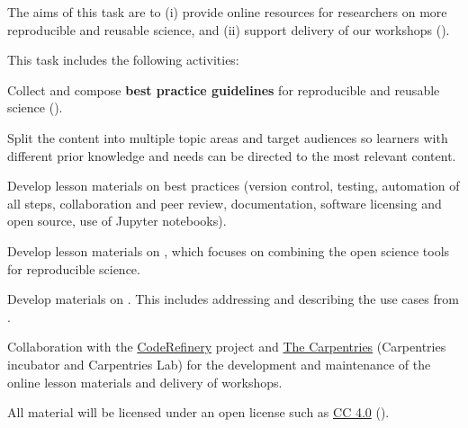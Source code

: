 \begin{task}[
  title=Best practice guidelines for reproducible science,
  id=online-resources,
  lead=IFR,
  PM=13,
  partners={SRL,MP,UIO}
]
The aims of this task are to (i) provide online resources for researchers on more reproducible
and reusable science, and (ii) support delivery of our workshops
().

This task includes the following activities:
  \begin{compactitem}
  \item Collect and compose \textbf{best practice guidelines} for reproducible and
    reusable science ().
  \item Split the content into multiple topic areas and target audiences so learners
    with different prior knowledge and needs can be directed to the most relevant content.
  \item Develop lesson materials on  best practices (version
    control, testing, automation of all steps, collaboration and peer review,
    documentation, software licensing and open source, use of Jupyter
    notebooks).
  \item Develop lesson materials on ,
    which focuses on combining the open science tools for reproducible science.
  \item Develop materials on . This includes addressing and describing the
    use cases from .
  \item Collaboration with the \href{https://coderefinery.org}{CodeRefinery}
    project and \href{https://carpentries.org/}{The Carpentries} (Carpentries incubator and Carpentries Lab)
    for the development and maintenance of the online lesson materials and delivery of workshops.
  \end{compactitem}
  All material will be licensed under an open license such as
  \href{https://creativecommons.org/licenses/by/4.0/}{CC 4.0}
  ().
\end{task}
